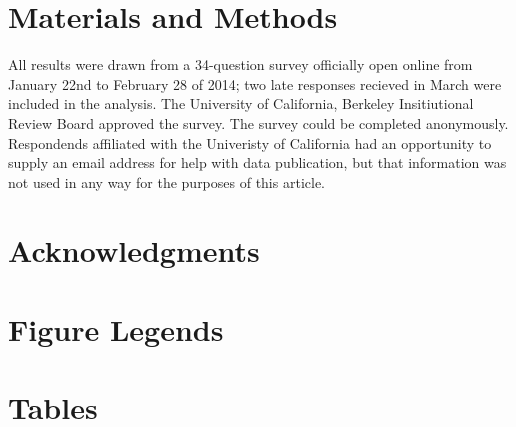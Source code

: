 \documentclass[10pt]{article}
\begin{document}
\section*{Materials and Methods}
All results were drawn from a 34-question survey officially open online from January 22nd to February 28 of 2014; two late responses recieved in March were included in the analysis.
The University of California, Berkeley Insitiutional Review Board approved the survey.
The survey could be completed anonymously.
Respondends affiliated with the Univeristy of California had an opportunity to supply an email address for help with data publication, but that information was not used in any way for the purposes of this article.





\section*{Acknowledgments}




\section*{Figure Legends}


\section*{Tables}
\end{document}
